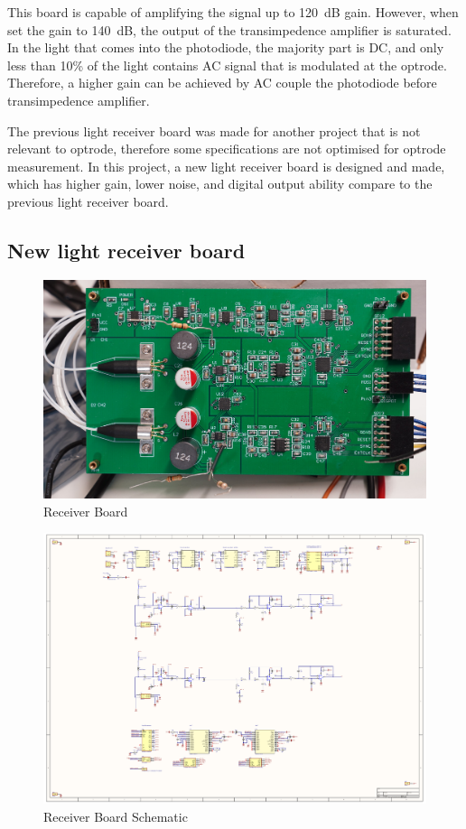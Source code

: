 This board is capable of amplifying the signal up to \qty{120}{dB} gain.  However, when set the gain to \qty{140}{dB}, the output of the transimpedence amplifier is saturated.  In the light that comes into the photodiode, the majority part is DC, and only less than 10\% of the light contains AC signal that is modulated at the optrode.  Therefore, a higher gain can be achieved by AC couple the photodiode before transimpedence amplifier.

The previous light receiver board was made for another project that is not relevant to optrode, therefore some specifications are not optimised for optrode measurement.  In this project, a new light receiver board is designed and made, which has higher gain, lower noise, and digital output ability compare to the previous light receiver board.

\subsection{New light receiver board}

\begin{figure}[h]
\centering
\includegraphics[width=0.9\linewidth]{4-ANC_Sys/ReceiverBoard.jpg}
\caption{Receiver Board}
\label{fig_ReceiverBoard}
\end{figure}

\begin{figure}[h]
\centering
\includegraphics[width=1\linewidth]{4-ANC_Sys/ReceiverAmplifierBoardSchematic_23_5_2023.pdf}
\caption{Receiver Board Schematic}
\label{fig_sch}
\end{figure}

